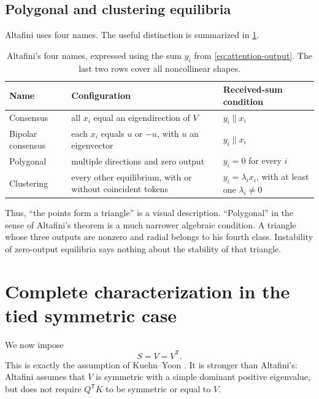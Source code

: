 \documentclass[11pt,a4paper]{article}
\theoremstyle{definition}
\newcommand{\T}{\mathsf T}
\begin{document}
\subsection{Polygonal and clustering equilibria}
\label{sec:terminology}

Altafini \cite{altafini2025multistability} uses four names. The useful distinction is
summarized in \cref{tab:altafini-classes}.

\begin{table}[ht]
\centering
\caption{Altafini's four names, expressed using the sum $y_i$ from
\eqref{eq:attention-output}. The last two rows cover all noncollinear shapes.}
\label{tab:altafini-classes}
\begin{tabularx}{\textwidth}{@{}lXl@{}}
\toprule
Name & Configuration & Received-sum condition \\
\midrule
Consensus & all $x_i$ equal an eigendirection of $V$ & $y_i\parallel x_i$ \\
Bipolar consensus & each $x_i$ equals $u$ or $-u$, with $u$ an eigenvector & $y_i\parallel x_i$ \\
Polygonal & multiple directions and zero output & $y_i=0$ for every $i$ \\
Clustering & every other equilibrium, with or without coincident tokens & $y_i=\lambda_i x_i$, with at least one $\lambda_i\neq0$ \\
\bottomrule
\end{tabularx}
\end{table}

Thus, ``the points form a triangle'' is a visual description. ``Polygonal'' in the
sense of Altafini's theorem is a much narrower algebraic condition. A triangle whose
three outputs are nonzero and radial belongs to his fourth class. Instability of
zero-output equilibria says nothing about the stability of that triangle.

\section{Complete characterization in the tied symmetric case}
\label{sec:symmetric}

We now impose
\begin{equation}
 S=V=V^{\T}.                                                \label{eq:tied-symmetry}
\end{equation}
This is exactly the assumption of Kuehn--Yoon \cite{kuehnyoon2026spectral}. It is
stronger than Altafini's: Altafini assumes that $V$ is symmetric with a simple dominant
positive eigenvalue, but does not require $Q^{\T}K$ to be symmetric or equal to $V$.
\end{document}

